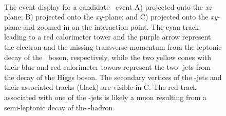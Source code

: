 \begin{figure}[htbp]
  \centering
  \mbox{
  }
  \mbox{
  }
  \caption[Event Display for \WenHbb\ Candidate]{The event display for a candidate \WenHbb\ event A) projected onto the \textit{xz}-plane; B) projected onto the \textit{xy}-plane; and C) projected onto the \textit{xy}-plane and zoomed in on the interaction point. The cyan track leading to a red calorimeter tower and the purple arrow represent the electron and the missing transverse momentum from the leptonic decay of the \bosW\ boson, respectively, while the two yellow cones with their blue and red calorimeter towers represent the two \qrkb-jets from the decay of the Higgs boson. The secondary vertices of the \qrkb-jets and their associated tracks (black) are visible in C. The red track associated with one of the \qrkb-jets is likely a muon resulting from a semi-leptonic decay of the \qrkb-hadron.}
  \label{fig:evt_disp_Wen}
\end{figure}


